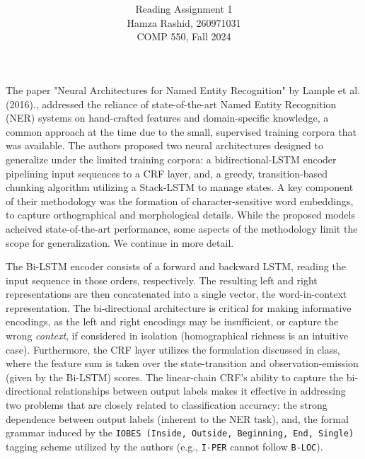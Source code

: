 \documentclass[11pt]{article}
\title{ }
\author{ Reading Assignment 1 \\ Hamza Rashid, 260971031 \\ COMP 550, Fall 2024}
\date{}
\begin{document}
\maketitle

\vspace{-5ex}
The paper "Neural Architectures for 
Named Entity Recognition" by Lample et al. (2016)., 
addressed the reliance of state-of-the-art 
Named Entity Recognition (NER) systems on 
hand-crafted  features and domain-specific knowledge, 
a common approach at the time due to the small, 
supervised training corpora that was available. 
The authors proposed two neural 
architectures designed to generalize 
under the limited training corpora: a 
bidirectional-LSTM encoder pipelining input sequences
to a CRF layer, and, a greedy, transition-based 
chunking algorithm utilizing a Stack-LSTM to manage states. 
A key component of their methodology was
the formation of character-sensitive word 
embeddings, to capture orthographical and morphological 
details. While the proposed models acheived
state-of-the-art performance, some aspects
of the methodology limit the scope for generalization. 
We continue in more detail.


The Bi-LSTM encoder consists of a forward and backward 
LSTM, reading the input sequence in those orders, respectively.
The resulting left and right representations are then concatenated
into a single vector, the word-in-context representation.
The bi-directional architecture is critical 
for making informative encodings, 
as the left and right encodings 
may be insufficient, or capture the wrong \textit{context},
if considered in isolation
(homographical richness is an intuitive case). 
Furthermore, the CRF layer utilizes the formulation
discussed in class, where the feature sum is taken 
over the state-transition and observation-emission (given by the Bi-LSTM) scores.
The linear-chain CRF's ability to capture the bi-directional
relationships between output labels makes it effective in addressing 
two problems that are closely related to classification accuracy: 
the strong dependence between output labels (inherent to the NER task), 
and, the formal grammar induced by the \texttt{IOBES (Inside, Outside, Beginning, End, Single)}
tagging scheme utilized by the authors (e.g., \texttt{I-PER} cannot follow \texttt{B-LOC}).
\end{document}
